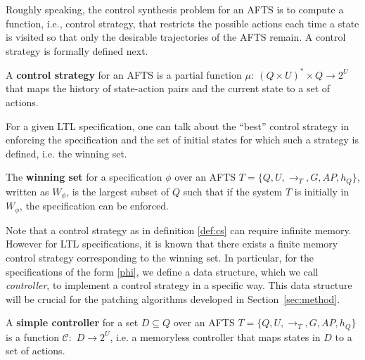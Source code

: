 

Roughly speaking, the control synthesis problem for an AFTS is to compute a function, i.e., control strategy, that restricts the possible actions each time a state is visited so that only the desirable trajectories of the AFTS remain. A control strategy is formally defined next.

\begin{definition}
	A \textbf{control strategy} for an AFTS is a partial function $ \mu:~(Q\times U)^*\times Q\rightarrow 2^U $ that maps the history of state-action pairs and the current state to a set of actions.\label{def:cs}
\end{definition}

For a given LTL specification, one can talk about the ``best'' control strategy in enforcing the specification
and the set of initial states for which such a strategy is defined, i.e. the winning set.

\begin{definition}
	The \textbf{winning set} for a specification $ \phi $ over an AFTS $T = \{Q,U,\rightarrow_T,G,AP,h_Q\}$, written as $ W_{\phi} $, is the largest subset of $ Q $ such that if the system $ T $ is initially in $ W_{\phi} $, the specification can be enforced.\label{def:winset}
\end{definition}

Note that a control strategy as in definition \ref{def:cs} can require infinite memory. However for LTL specifications, it is known that there exists a finite memory control strategy corresponding to the winning set. In particular, for the specifications of the form \eqref{phi}, we define a data structure, which we call \emph{controller}, to implement a control strategy in a specific way. This data structure will be crucial for the patching algorithms developed
in Section~\ref{sec:method}.

\begin{definition}
	A \textbf{simple controller} for a set $ D\subseteq Q $ over an AFTS $ T=\{Q,U,\rightarrow_T,G,AP,h_Q\} $ is a function $ \mathcal{C}: $ $ D\rightarrow 2^U $, i.e. a memoryless controller that maps states in $ D $ to a set of actions. %
	\label{def:simp}
\end{definition}

